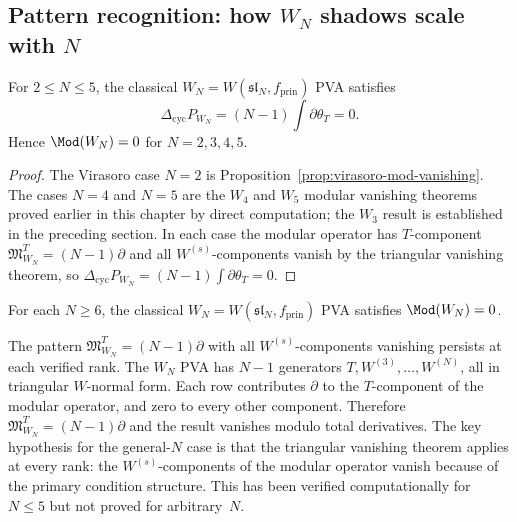 \subsection{Pattern recognition: how $W_N$ shadows scale with $N$}

\begin{theorem}
\label{prop:WN-modular-vanishing}%
%
For $2 \le N \le 5$, the classical $W_N = W(\mathfrak{sl}_N, f_{\mathrm{prin}})$
PVA satisfies
\[
\Delta_{\mathrm{cyc}} P_{W_N} = (N-1)\int\partial\theta_T = 0.
\]
Hence $\Mod(W_N) = 0$ for $N = 2, 3, 4, 5$.
\end{theorem}

\begin{proof}
The Virasoro case $N = 2$ is
Proposition~\ref{prop:virasoro-mod-vanishing}.
The cases $N = 4$ and $N = 5$ are the $W_4$ and $W_5$ modular
vanishing theorems proved earlier in this chapter by direct
computation; the $W_3$ result is established in the preceding section.
In each case the modular operator has $T$-component
$\mathfrak{M}_{W_N}^T = (N-1)\partial$ and all
$W^{(s)}$-components vanish by the triangular vanishing theorem, so
$\Delta_{\mathrm{cyc}} P_{W_N} = (N-1)\int\partial\theta_T = 0$.
\end{proof}

\begin{conjecture}
\label{conj:WN-modular-vanishing-general}%
For each $N \ge 6$, the classical $W_N = W(\mathfrak{sl}_N, f_{\mathrm{prin}})$
PVA satisfies $\Mod(W_N) = 0$.
\end{conjecture}

\begin{remark}
The pattern $\mathfrak{M}_{W_N}^T = (N-1)\partial$ with all
$W^{(s)}$-components vanishing persists at each verified rank.
The $W_N$ PVA has $N-1$ generators
$T, W^{(3)}, \dots, W^{(N)}$, all in triangular $W$-normal form.
Each row contributes $\partial$ to the $T$-component of the
modular operator, and zero to every other component.
Therefore $\mathfrak{M}_{W_N}^T = (N-1)\partial$ and the
result vanishes modulo total derivatives. The key hypothesis
for the general-$N$ case is that the triangular vanishing
theorem applies at every rank: the $W^{(s)}$-components of
the modular operator vanish because of the primary condition
structure. This has been verified computationally for $N \leq 5$
but not proved for arbitrary~$N$.
\end{remark}

